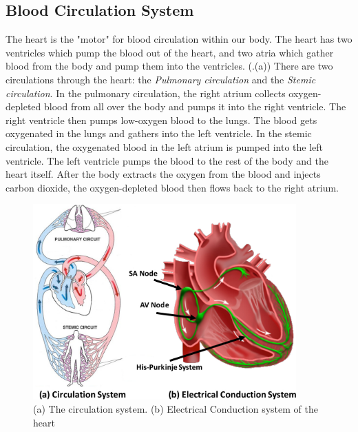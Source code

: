 \subsection{Blood Circulation System}
The heart is the "motor" for blood circulation within our body. The heart has two ventricles which pump the blood out of the heart, and two atria which gather blood from the body and pump them into the ventricles. (.(a)) There are two circulations through the heart: the \emph{Pulmonary circulation} and the \emph{Stemic circulation}. In the pulmonary circulation, the right atrium collects oxygen-depleted blood from all over the body and pumps it into the right ventricle. The right ventricle then pumps low-oxygen blood to the lungs. The blood gets oxygenated in the lungs and gathers into the left ventricle. In the stemic circulation, the oxygenated blood in the left atrium is pumped into the left ventricle. The left ventricle pumps the blood to the rest of the body and the heart itself. After the body extracts the oxygen from the blood and injects carbon dioxide, the oxygen-depleted blood then flows back to the right atrium.
\begin{figure}[!t]
\centering
		\includegraphics[width=0.9\textwidth]{figs/circulation.pdf}
		
\caption{\small (a) The circulation system. (b) Electrical Conduction system of the heart}
\label{fig:circulation}
\end{figure} 
